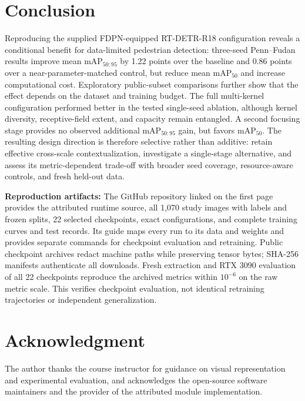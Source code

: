 \documentclass[journal]{IEEEtran}
\newcommand{\mapfifty}{mAP$_{50}$}
\newcommand{\mapcoco}{mAP$_{50:95}$}
\begin{document}
\FloatBarrier
\section{Conclusion}
Reproducing the supplied FDPN-equipped RT-DETR-R18 configuration reveals a conditional benefit for data-limited pedestrian detection: three-seed Penn--Fudan results improve mean \mapcoco{} by 1.22 points over the baseline and 0.86 points over a near-parameter-matched control, but reduce mean \mapfifty{} and increase computational cost. Exploratory public-subset comparisons further show that the effect depends on the dataset and training budget. The full multi-kernel configuration performed better in the tested single-seed ablation, although kernel diversity, receptive-field extent, and capacity remain entangled. A second focusing stage provides no observed additional \mapcoco{} gain, but favors \mapfifty{}. The resulting design direction is therefore selective rather than additive: retain effective cross-scale contextualization, investigate a single-stage alternative, and assess its metric-dependent trade-off with broader seed coverage, resource-aware controls, and fresh held-out data.

\noindent\textbf{Reproduction artifacts:} The GitHub repository linked on the first page provides the attributed runtime source, all 1,070 study images with labels and frozen splits, 22 selected checkpoints, exact configurations, and complete training curves and test records. Its guide maps every run to its data and weights and provides separate commands for checkpoint evaluation and retraining. Public checkpoint archives redact machine paths while preserving tensor bytes; SHA-256 manifests authenticate all downloads. Fresh extraction and RTX 3090 evaluation of all 22 checkpoints reproduce the archived metrics within $10^{-6}$ on the raw metric scale. This verifies checkpoint evaluation, not identical retraining trajectories or independent generalization.

\section{Acknowledgment}
The author thanks the course instructor for guidance on visual representation and experimental evaluation, and acknowledges the open-source software maintainers and the provider of the attributed module implementation.




\FloatBarrier
\appendices
\end{document}
